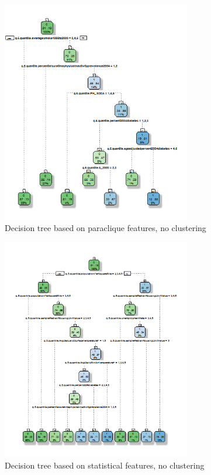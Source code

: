 \documentclass[conference,compsoc]{IEEEtran}
\begin{document}
\begin{figure}[!t]
\centering
\includegraphics[width=3.25in]{decision-tree-01-paraclique-no-clustering.png}
\caption{Decision tree based on paraclique features, no clustering}
\label{decision.tree.01}
\end{figure}

\begin{figure}[!t]
\centering
\includegraphics[width=3.25in]{decision-tree-02-all-no-clustering.png}
\caption{Decision tree based on statistical features, no clustering}
\label{decision.tree.02}
\end{figure}
\end{document}
